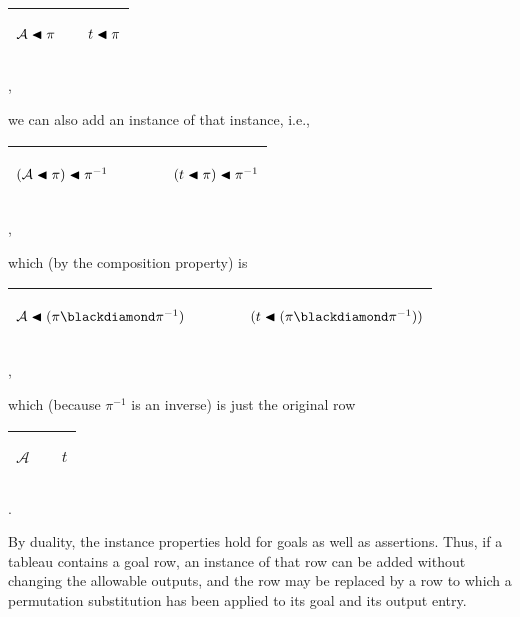 \documentclass[runningheads]{llncs}
\begin{document}
 \begin{center}
\begin{tabular}{T}
\hline
  \begin{center}$\mathcal{A}\blacktriangleleft \pi$\end{center} & \qquad &  \begin{center}$t\blacktriangleleft\pi$\end{center} \\
  \hline
\end{tabular},
\end{center}
we can also add an instance of that instance, i.e., 
 \begin{center}
\begin{tabular}{T}
\hline
  \begin{center}$(\mathcal{A}\blacktriangleleft \pi) \blacktriangleleft \pi^{-1} $\end{center} &   $\qquad$ &  \begin{center}$(t\blacktriangleleft\pi) \blacktriangleleft \pi^{-1}$\end{center} \\
  \hline
\end{tabular},
\end{center}
which (by the composition property) is
 \begin{center}
\begin{tabular}{T}
\hline
  \begin{center}$\mathcal{A}\apply (\pi \compose \pi^{-1}) $\end{center} &   $\qquad$ &  \begin{center}$(t\apply (\pi \compose \pi^{-1}))$\end{center} \\
  \hline
\end{tabular},
\end{center}
which (because $\pi^{-1}$ is an inverse) is just the original row
 \begin{center}
\begin{tabular}{T}
\hline
  \begin{center}$\mathcal{A} $\end{center} &  \qquad &  \begin{center}$t$\end{center} \\
  \hline
\end{tabular}.
\end{center}

By duality, the instance properties hold for goals as well as assertions.  Thus, if a tableau contains a goal row, an instance of that row can be added without changing the allowable outputs, and the row may be replaced by a row to which a permutation substitution has been applied to its goal and its output entry.
\end{document}
